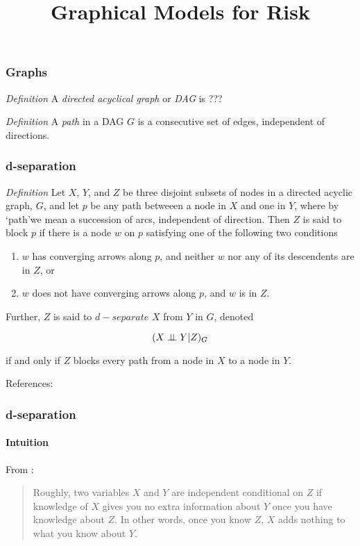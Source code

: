 


\title{Graphical Models for Risk}

\maketitle

\begin{frame}
\frametitle{Graphs}

\emph{Definition} A \emph{directed acyclical graph} or \emph{DAG} is ??? \newline

\emph{Definition} A \emph{path} in a DAG $G$ is a consecutive set of edges, independent of directions. \newline

\end{frame}

\begin{frame}
\frametitle{d-separation}
\emph{Definition} Let $X$, $Y$, and $Z$ be three disjoint subsets of nodes in a directed acyclic graph, $G$, and let $p$ be any path betweeen a node in $X$ and one in $Y$, where by `path'we mean a succession of arcs, independent of direction. Then $Z$ is said to block $p$ if there is a node $w$ on $p$ satisfying one of the following two conditions

\begin{enumerate}
\item $w$ has converging arrows along $p$, and neither $w$ nor any of its descendents are in $Z$, or
\item $w$ does not have converging arrows along $p$, and $w$ is in $Z$.
\end{enumerate}

Further, $Z$ is said to $d-separate$ $X$ from $Y$ in $G$, denoted 

\begin{equation*}
    (X \perp\!\!\!\perp Y | Z)_G
\end{equation*}

if and only if $Z$ blocks every path from a node in $X$ to a node in $Y$.\newline

References: \cite{pearl1995causal}
\end{frame}


\begin{frame}
\frametitle{d-separation}
\framesubtitle{Intuition}
From \cite{scheines-tutorial}: \newline

\begin{quote}
Roughly, two variables $X$ and $Y$ are independent conditional on $Z$ if knowledge of $X$ gives you no extra information about $Y$ once you have knowledge about $Z$. In other words, once you know $Z$, $X$ adds nothing to what you know about $Y$.
\end{quote}

\end{frame}

